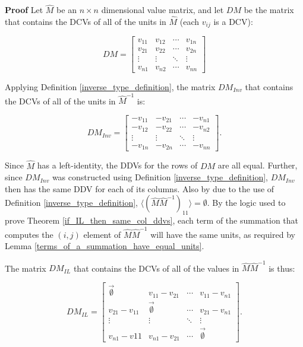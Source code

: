 \documentclass[10pt,letterpaper]{article}
\newenvironment{proof}{\noindent\textbf{Proof} }{\qed \newline}
\newcommand{\qed}{\nobreak \ifvmode \relax \else
      \ifdim\lastskip<1.5em \hskip-\lastskip
      \hskip1.5em plus0em minus0.5em \fi \nobreak
      \vrule height0.75em width0.5em depth0.25em\fi}
\numberwithin{equation}{section}
\begin{document}
\begin{proof}Let $\hat M$ be an $n \times n$ dimensional value
matrix, and let $DM$ be the matrix that contains the DCVs of all
of the units in $\hat M$ (each $v_{ij}$ is a DCV):

\[ DM = \left[ \begin{matrix} 
  v_{11} & v_{12} & \cdots & v_{1n} \\
  v_{21} & v_{22} & \cdots & v_{2n} \\
  \vdots & \vdots & \ddots & \vdots \\
  v_{n1} & v_{n2} & \cdots & v_{nn}
\end{matrix} \right] \]

Applying Definition \ref{inverse_type_definition}, the matrix $DM_{Inv}$ that
contains the DCVs of all of the units in $\hat M^{-1}$ is:

\[ DM_{Inv} = \left[ \begin{matrix} 
  -v_{11} & -v_{21} & \cdots & -v_{n1} \\
  -v_{12} & -v_{22} & \cdots & -v_{n2} \\
  \vdots & \vdots & \ddots & \vdots \\
  -v_{1n} & -v_{2n} & \cdots & -v_{nn}
 \end{matrix} \right]. \]

Since $\hat M$ has a left-identity, the DDVs for the rows of $DM$ are
all equal.  Further, since $DM_{Inv}$ was constructed using Definition
\ref{inverse_type_definition}, $DM_{Inv}$ then has the same DDV for
each of its columns.  Also by due to the use of Definition
\ref{inverse_type_definition}, $\langle (\hat M \hat M^{-1})_{11}
\rangle = \emptyset$.  By the logic used to prove Theorem
 \ref{if_IL_then_same_col_ddvs}, each term of the summation that
computes the $(i, j)$ element of $\hat M \hat M^{-1}$ will have the
same units, as required by Lemma
\ref{terms_of_a_summation_have_equal_units}.

The matrix $DM_{IL}$ that contains the DCVs of all of the values in
$\hat M \hat M^{-1}$ is thus:

\[ DM_{IL} = \left[ \begin{matrix} 
  \vec{\emptyset} & v_{11} - v_{21} & \cdots & v_{11} - v_{n1} \\
  v_{21} - v_{11} & \vec{\emptyset} & \cdots & v_{21} - v_{n1} \\
  \vdots & \vdots & \ddots & \vdots \\
  v_{n1} - v{11} & v_{n1} - v_{21} & \cdots & \vec{\emptyset}
 \end{matrix} \right]. \]


\end{proof}
\end{document}
